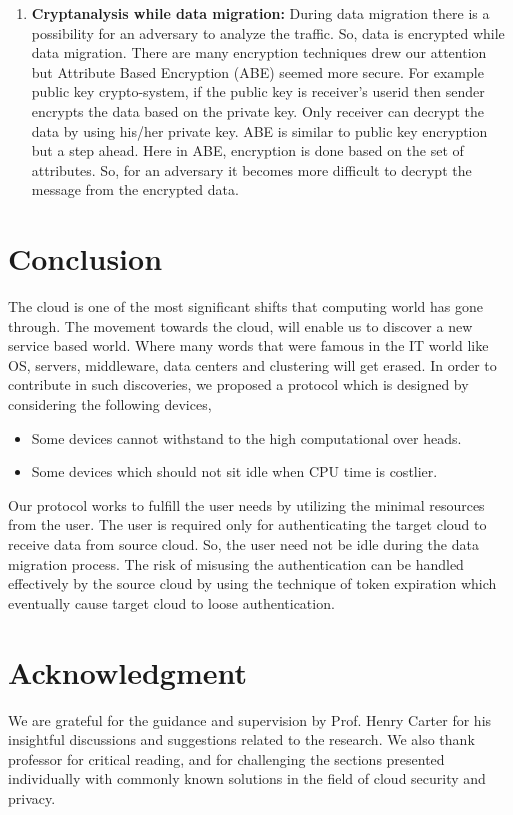 \documentclass[11pt, pdftex, conference]{IEEEtran}
\begin{document}
\begin{enumerate}
\item \textbf{Cryptanalysis while data migration:} During data migration there is a possibility for an adversary to analyze the traffic. So, data is encrypted while data migration. There are many encryption techniques drew our attention but Attribute Based Encryption (ABE) seemed more secure. For example public key crypto-system, if the public key is receiver’s userid then sender encrypts the data based on the private key. Only receiver can decrypt the data by using his/her private key.  ABE is similar to public key encryption but a step ahead. Here in ABE, encryption is done based on the set of attributes. So, for an adversary it becomes more difficult to decrypt the message from the encrypted data. 
\end{enumerate}

\section{\textbf{Conclusion}}
\hspace{10mm} The cloud is one of the most significant shifts that computing world has gone through. The movement towards the cloud, will enable us to discover a new service based world. Where many words that were famous in the IT world like OS, servers, middleware, data centers and clustering will get erased. In order to contribute in such discoveries, we proposed a protocol which is designed by considering the following devices,
\begin{itemize}
\item Some devices cannot withstand to the high computational over heads.
\item Some devices which should not sit idle when CPU time is costlier. 
\end{itemize}
\hspace{10mm}Our protocol works to fulfill the user needs by utilizing the minimal resources from the user. The user is required only for authenticating the target cloud to receive data from source cloud. So, the user need not be idle during the data migration process. The risk of misusing the authentication can be handled effectively by the source cloud by using the technique of token expiration which eventually cause target cloud to loose authentication.

\section{\textbf{Acknowledgment}}
\hspace{10mm}We are grateful for the guidance and supervision by Prof. Henry Carter for his insightful discussions and suggestions related to the research. We also thank professor for critical reading, and for challenging the sections presented individually with commonly known solutions in the field of cloud security and privacy.


 
\end{document}
